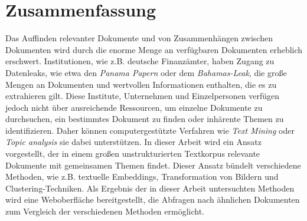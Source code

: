 \chapter*{Zusammenfassung}

Das Auffinden relevanter Dokumente und von Zusammenhängen zwischen Dokumenten wird durch die enorme Menge an verfügbaren Dokumenten erheblich erschwert.
Institutionen, wie z.B. deutsche Finanzämter, haben Zugang zu Datenleaks, wie etwa den \textit{Panama Papern} oder dem \textit{Bahamas-Leak}, 
die große Mengen an Dokumenten und wertvollen Informationen enthalten, die es zu extrahieren gilt.
Diese Institute, Unternehmen und Einzelpersonen verfügen jedoch nicht über ausreichende Ressourcen, um einzelne Dokumente 
zu durchsuchen, ein bestimmtes Dokument zu finden oder inhärente Themen zu identifizieren.
Daher können computergestützte Verfahren wie \textit{Text Mining} oder \textit{Topic analysis} sie dabei unterstützen.
In dieser Arbeit wird ein Ansatz vorgestellt, der in einem großen unstrukturierten Textkorpus relevante Dokumente mit gemeinsamen Themen findet.
Dieser Ansatz bündelt verschiedene Methoden, wie z.B. textuelle Embeddings, Transformation von Bildern und Clustering-Techniken.
Als Ergebnis der in dieser Arbeit untersuchten Methoden wird eine Weboberfläche bereitgestellt, die Abfragen nach ähnlichen Dokumenten 
zum Vergleich der verschiedenen Methoden ermöglicht.